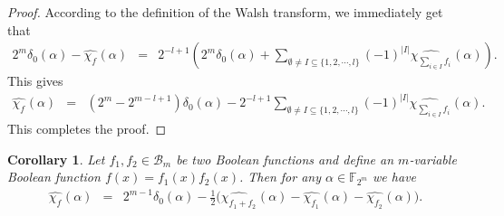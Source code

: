 \documentclass[10pt]{article}
\newtheorem{corollary}{Corollary}
\newcommand{\F}{\mathbb{F}}
\newcommand{\0}{\textbf{0}}
\newcommand{\1}{\textbf{1}}
\newcommand{\W}[2][]{\widehat{\chi_{#2}}^{#1}}
\newcommand{\CardI}{\left|I\right|}
\begin{document}
{\begin{proof}
According to the definition of the Walsh transform, we immediately get that
 \begin{eqnarray*}
2^m\delta_0(\alpha)-\W f(\alpha)&=&2^{-l+1}\left(2^m\delta_0(\alpha)+\sum_{\emptyset\neq I\subseteq \{1,2,\cdots, l\}}(-1)^{\CardI}\W {\sum_{i\in I}f_i}(\alpha)\right).
\end{eqnarray*}
This gives
 \begin{eqnarray*}
\W f(\alpha)&=&\left(2^m-2^{m-l+1}\right)\delta_0(\alpha)-2^{-l+1}\sum_{\emptyset\neq I\subseteq \{1,2,\cdots, l\}}(-1)^{\CardI}\W {\sum_{i\in I}f_i}(\alpha).
\end{eqnarray*}
This completes the proof.
\end{proof}

\begin{corollary}\label{C:WalshTwoProd}
Let $f_1,f_2\in\mathcal{B}_m$ be two Boolean functions and define an $m$-variable Boolean function $f(x)=f_1(x)f_2(x)$.
Then for any $\alpha\in\F_{2^m}$ we have
\begin{eqnarray*}
\W f(\alpha)&=&2^{m-1}\delta_0(\alpha)-\frac{1}{2}\Big(\W {f_1+f_2}(\alpha)-\W {f_1}(\alpha)-\W {f_2}(\alpha)\Big).
\end{eqnarray*}
\end{corollary}

}
\end{document}
